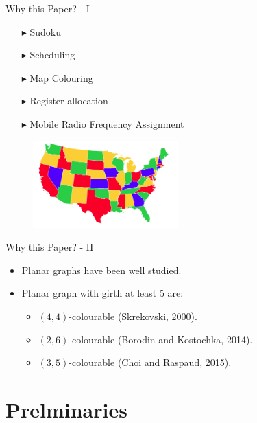 \documentclass[10pt, compress]{beamer}
\begin{document}
\begin{frame}{Why this Paper? - I}
\begin{itemize}[itemsep=0.3cm]
\item[$\blacktriangleright$] Sudoku
\item[$\blacktriangleright$] Scheduling
\item[$\blacktriangleright$] Map Colouring
\item[$\blacktriangleright$] Register allocation
\item[$\blacktriangleright$] Mobile Radio Frequency Assignment
\end{itemize}
\begin{figure}
\centering
\includegraphics[width=0.5\textwidth]{figures/map2.png}
\end{figure}
\end{frame}

\begin{frame}{Why this Paper? - II}
\begin{itemize}[itemsep=0.5cm]
\item Planar graphs have been well studied.
\item Planar graph with girth at least 5 are:
\begin{itemize}[itemsep=0.5cm]
\item $(4,4)$-colourable (Skrekovski, 2000).
\item $(2,6)$-colourable (Borodin and Kostochka, 2014).
\item $(3,5)$-colourable (Choi and Raspaud, 2015).
\end{itemize}
\end{itemize}
\end{frame}

\section{Prelminaries}
\end{document}
